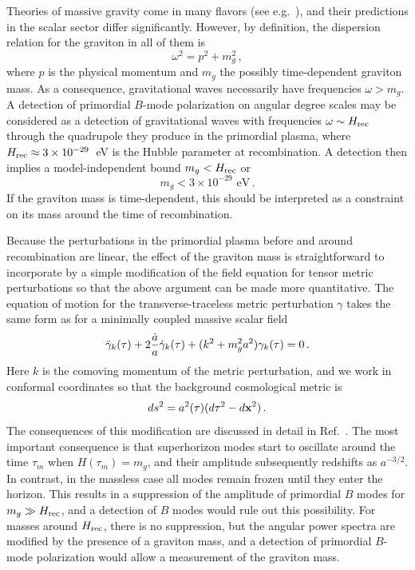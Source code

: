 Theories of massive gravity come in many flavors (see e.g.~\cite{Dubovsky:2004sg,Hinterbichler:2011tt}), and their predictions in the scalar sector differ significantly. However, by definition, the dispersion relation for the graviton in all of them is
\begin{equation}
\omega^2=p^2+m_g^2\,,
\end{equation}
where $p$ is the physical momentum and $m_g$ the possibly time-dependent graviton mass. As a consequence, gravitational waves necessarily have frequencies $\omega>m_g$. A detection of primordial $B$-mode polarization on angular degree scales may be considered as a detection of gravitational waves with frequencies $\omega\sim H_{\rm rec}$ through the quadrupole they produce in the primordial plasma, where $H_{\rm rec}\approx 3\times 10^{-29}$~eV is the Hubble parameter at recombination. A detection then implies a model-independent bound $m_g<H_{\rm rec}$ or 
\begin{equation}
m_g< 3\times 10^{-29}{\mbox{ eV}}\,.
\end{equation}
If the graviton mass is time-dependent, this should be interpreted as a constraint on its mass around the time of recombination.

Because the perturbations in the primordial plasma before and around recombination are linear, the effect of the graviton mass is straightforward to incorporate by a simple modification of the field equation for tensor metric perturbations so that the above argument can be made more quantitative. The equation of motion for the transverse-traceless metric perturbation $\gamma$ takes the same form as for a minimally coupled massive scalar field
\begin{equation}
\label{massive}
\ddot{\gamma}_k(\tau)+2{\dot a\over a} \dot{\gamma}_k(\tau)+(k^2+m_g^2 a^2) \gamma_k(\tau)=0\,.
\end{equation}
Here $k$ is the comoving momentum of the metric perturbation, and we work in conformal coordinates so that the background cosmological metric is
\begin{equation}
ds^2= a^2(\tau)(d\tau^2-d{\bf x}^2)\,.
\end{equation}
The consequences of this modification are discussed in detail in Ref.~\cite{Dubovsky:2009xk}. The most important consequence is that superhorizon modes start to oscillate around the time $\tau_m$ when $H(\tau_m)=m_g$, and their amplitude subsequently redshifts as $a^{-3/2}$. In contrast, in the massless case all modes remain frozen until they enter the horizon. This results in a suppression of the amplitude of primordial $B$ modes for $m_g\gg H_{\rm rec}$, and a detection of $B$ modes would rule out this possibility. For masses around $H_{\rm rec}$, there is no suppression, but the angular power spectra are modified by the presence of a graviton mass, and a detection of primordial $B$-mode polarization would allow a measurement of the graviton mass. 
 
